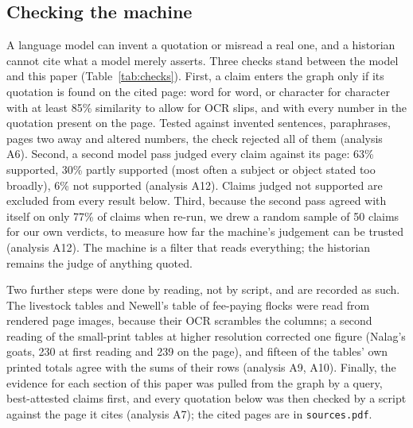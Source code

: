 \documentclass[10pt,a4paper,twocolumn]{article}
\newcommand{\an}[1]{(analysis #1)}
\begin{document}
\subsection{Checking the machine}

A language model can invent a quotation or misread a real one, and a historian cannot cite what a model merely asserts. Three checks stand between the model and this paper (Table~\ref{tab:checks}). First, a claim enters the graph only if its quotation is found on the cited page: word for word, or character for character with at least 85\% similarity to allow for OCR slips, and with every number in the quotation present on the page. Tested against invented sentences, paraphrases, pages two away and altered numbers, the check rejected all of them \an{A6}. Second, a second model pass judged every claim against its page: 63\% supported, 30\% partly supported (most often a subject or object stated too broadly), 6\% not supported \an{A12}. Claims judged not supported are excluded from every result below. Third, because the second pass agreed with itself on only 77\% of claims when re-run, we drew a random sample of 50 claims for our own verdicts, to measure how far the machine's judgement can be trusted \an{A12}. The machine is a filter that reads everything; the historian remains the judge of anything quoted.

Two further steps were done by reading, not by script, and are recorded as such. The livestock tables and Newell's table of fee-paying flocks were read from rendered page images, because their OCR scrambles the columns; a second reading of the small-print tables at higher resolution corrected one figure (Nalag's goats, 230 at first reading and 239 on the page), and fifteen of the tables' own printed totals agree with the sums of their rows \an{A9, A10}. Finally, the evidence for each section of this paper was pulled from the graph by a query, best-attested claims first, and every quotation below was then checked by a script against the page it cites \an{A7}; the cited pages are in \texttt{sources.pdf}.
\end{document}
